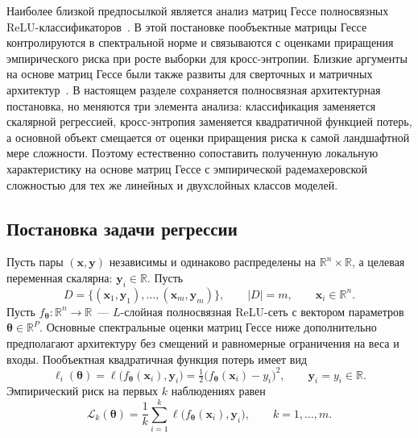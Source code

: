 Наиболее близкой предпосылкой является анализ матриц Гессе полносвязных ReLU-классификаторов~\cite{grabovoi2024unraveling748584228}. В этой постановке пообъектные матрицы Гессе контролируются в спектральной норме и связываются с оценками приращения эмпирического риска при росте выборки для кросс-энтропии. Близкие аргументы на основе матриц Гессе были также развиты для сверточных и матричных архитектур~\cite{grabovoi2024convnets743111032}. В настоящем разделе сохраняется полносвязная архитектурная постановка, но меняются три элемента анализа: классификация заменяется скалярной регрессией, кросс-энтропия заменяется квадратичной функцией потерь, а основной объект смещается от оценки приращения риска к самой ландшафтной мере сложности. Поэтому естественно сопоставить полученную локальную характеристику на основе матриц Гессе с эмпирической радемахеровской сложностью для тех же линейных и двухслойных классов моделей.

\subsection{Постановка задачи регрессии}\label{ch1lc:sec:problem}

Пусть пары $(\mathbf{x},\mathbf{y})$ независимы и одинаково распределены на $\mathbb{R}^{n}\times\mathbb{R}$, а целевая переменная скалярна: $\mathbf{y}_i\in\mathbb{R}$.
Пусть
\[
  D = \{(\mathbf{x}_1,\mathbf{y}_1),\ldots,(\mathbf{x}_m,\mathbf{y}_m)\},
  \qquad |D|=m,
  \qquad \mathbf{x}_i\in\mathbb{R}^n .
\]
Пусть $f_{\boldsymbol{\theta}}:\mathbb{R}^{n}\to\mathbb{R}$~--- $L$-слойная полносвязная ReLU-сеть с вектором параметров
$\boldsymbol{\theta}\in\mathbb{R}^P$. Основные спектральные оценки матриц Гессе ниже дополнительно предполагают архитектуру без смещений и равномерные ограничения на веса и входы. Пообъектная квадратичная функция потерь имеет вид
\begin{equation}\label{ch1lc:eq:loss-i}
  \ell_i(\boldsymbol{\theta})
  = \ell\bigl(f_{\boldsymbol{\theta}}(\mathbf{x}_i),\mathbf{y}_i\bigr)
  = \tfrac{1}{2}\bigl(f_{\boldsymbol{\theta}}(\mathbf{x}_i)-y_i\bigr)^2,
  \qquad \mathbf{y}_i = y_i\in\mathbb{R}.
\end{equation}
Эмпирический риск на первых $k$ наблюдениях равен
\begin{equation}\label{ch1lc:eq:Lk}
  \mathcal{L}_k(\boldsymbol{\theta}) = \frac{1}{k}\sum_{i=1}^{k} \ell\bigl(f_{\boldsymbol{\theta}}(\mathbf{x}_i),\mathbf{y}_i\bigr),
  \qquad k=1,\ldots,m .
\end{equation}


